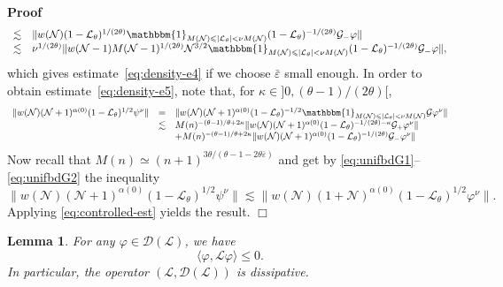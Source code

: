 \documentclass[10pt]{article}
\newenvironment{proof}{\noindent\textbf{Proof\ }}{\hspace*{\fill}$\Box$\medskip}
\newtheorem{lemma}{Lemma}
\begin{document}
\begin{proof}
\[\begin{array}{ll}
       \lesssim & \| w (\mathcal{N}) (1 -\mathcal{L}_{\theta})^{1 / (2
       \theta)}  \mathbbm{1}_{M (\mathcal{N}) \leqslant | \mathcal{L}_{\theta}
       | < \nu M (\mathcal{N})}  (1 -\mathcal{L}_{\theta})^{- 1 / (2 \theta)}
       \mathcal{G}_- \varphi \|\\
       \lesssim & \nu^{1 / (2 \theta)} \| w (\mathcal{N}- 1) M (\mathcal{N}-
       1)^{1 / (2 \theta)} \mathcal{N}^{3 / 2}  \mathbbm{1}_{M (\mathcal{N})
       \leqslant | \mathcal{L}_{\theta} | < \nu M (\mathcal{N})}  (1
       -\mathcal{L}_{\theta})^{- 1 / (2 \theta)} \mathcal{G}_- \varphi \|,
     \end{array} \]
  which gives estimate~{\eqref{eq:density-e4}} if we choose
  $\bar{\varepsilon}$ small enough. In order to obtain
  estimate~{\eqref{eq:density-e5}}, note that, for $\kappa \in] 0, (\theta -
  1) / (2 \theta) [$,
  \[ \begin{array}{lll}
       \| w (\mathcal{N}) (\mathcal{N}+ 1)^{\alpha (0)} (1
       -\mathcal{L}_{\theta})^{1 / 2} \psi^{\nu} \| & = & \| w (\mathcal{N})
       (\mathcal{N}+ 1)^{\alpha (0)} (1 -\mathcal{L}_{\theta})^{- 1 / 2} 
       \mathbbm{1}_{M (\mathcal{N}) \leqslant | \mathcal{L}_{\theta} | < \nu M
       (\mathcal{N})} \mathcal{G} \varphi^{\nu} \|\\
       & \lesssim & M (n)^{- (\theta - 1) / \theta + 2 \kappa} \| w
       (\mathcal{N}) (\mathcal{N}+ 1)^{\alpha (0)} (1
       -\mathcal{L}_{\theta})^{- 1 / (2 \theta) - \kappa} \mathcal{G}_+
       \varphi^{\nu} \|\\
       &  & + M (n)^{- (\theta - 1) / \theta + 2 \kappa} \| w (\mathcal{N})
       (\mathcal{N}+ 1)^{\alpha (0)} (1 -\mathcal{L}_{\theta})^{- 1 / (2
       \theta)} \mathcal{G}_- \varphi^{\nu} \|
     \end{array} \]
  Now recall that $M (n) \simeq (n + 1)^{3 \theta / (\theta - 1 - 2 \theta
  \bar{\varepsilon})}$ and get by {\eqref{eq:unifbdG1}}--{\eqref{eq:unifbdG2}}
  the inequality
  \[ \| w (\mathcal{N}) (\mathcal{N}+ 1)^{\alpha (0)} (1
     -\mathcal{L}_{\theta})^{1 / 2} \psi^{\nu} \| \lesssim \| w (\mathcal{N})
     (1 +\mathcal{N})^{\alpha (0)} (1 -\mathcal{L}_{\theta})^{1 / 2}
     \varphi^{\nu} \| . \]
  Applying {\eqref{eq:controlled-est}} yields the result.
\end{proof}

\begin{lemma}
  \label{lem:diss}For any $\varphi \in \mathcal{D} (\mathcal{L})$, we have
  \[ \langle \varphi, \mathcal{L} \varphi \rangle \leqslant 0. \]
  In particular, the operator $(\mathcal{L}, \mathcal{D} (\mathcal{L}))$ is
  dissipative.
\end{lemma}
\end{document}
